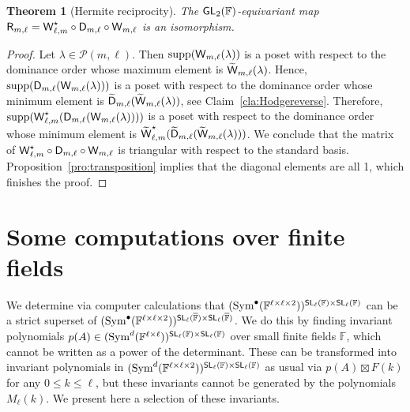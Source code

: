 \documentclass[a4paper]{extarticle}
\newcommand{\IF}{\mathbb{F}}
\newcommand{\oIF}{{\overline{\mathbb{F}}}}
\newcommand{\GL}{\textsf{\textup{GL}}}
\newcommand{\SL}{\textsf{\textup{SL}}}
\newcommand{\Sym}{\textup{Sym}}
\newcommand{\la}{\lambda}
\newcommand{\supp}{\textup{supp}}
\newcommand{\Hodge}{\textsf{\textup{D}}}
\newcommand{\Wronski}{\textsf{\textup{W}}}
\newcommand{\Hermite}{\textsf{\textup{R}}}
\newtheorem{theorem}{Theorem}
\numberwithin{theorem}{section}
\theoremstyle{definition}
\begin{document}
\begin{theorem}[Hermite reciprocity]\label{thm:hermiterec}
The $\GL_2(\IF)$-equivariant map $\Hermite_{m,\ell} =  \Wronski_{\ell,m}^\star\circ \Hodge_{m,\ell} \circ \Wronski_{m,\ell}$ is an isomorphism.
\end{theorem}

\begin{proof}
Let $\la\in\mathscr P(m,\ell)$.
Then $\supp(\Wronski_{m,\ell}(\la))$ is a poset with respect to the dominance order whose maximum element is $\widetilde{\Wronski}_{m,\ell}(\la)$.
Hence, $\supp(\Hodge_{m,\ell}(\Wronski_{m,\ell}(\la)))$ is a poset with respect to the dominance order whose minimum element is $\widetilde{\Hodge}_{m,\ell}(\widetilde{\Wronski}_{m,\ell}(\la))$, see Claim~\ref{cla:Hodgereverse}.
Therefore, $\supp(\Wronski^\star_{\ell,m}(\Hodge_{m,\ell}(\Wronski_{m,\ell}(\la))))$ is a poset with respect to the dominance order whose minimum element is $\widetilde{\Wronski}^\star_{\ell,m}(\widetilde{\Hodge}_{m,\ell}(\widetilde{\Wronski}_{m,\ell}(\la)))$.
We conclude that the matrix of $\Wronski^\star_{\ell,m}\circ\Hodge_{m,\ell}\circ\Wronski_{m,\ell}$
is triangular with respect to the standard basis.
Proposition~\ref{pro:transposition} implies that the diagonal elements are all 1, which finishes the proof.
\end{proof}








\section{Some computations over finite fields}
\label{sec:computations}
We determine via computer calculations that
$(\Sym^{\bullet}(\IF^{\ell\times\ell\times2}))^{\SL_\ell(\IF)\times \SL_\ell(\IF)}$
can be a strict superset of
$(\Sym^{\bullet}(\IF^{\ell\times\ell\times2}))^{\SL_\ell(\oIF)\times \SL_\ell(\oIF)}$.
We do this by finding invariant polynomials $p(A)\in (\Sym^d(\IF^{\ell\times\ell}))^{\SL_\ell(\IF)\times \SL_\ell(\IF)}$ over small finite fields $\IF$, which cannot be written as a power of the determinant. These can be transformed into invariant polynomials in $(\Sym^d(\IF^{\ell\times\ell\times2}))^{\SL_\ell(\IF)\times \SL_\ell(\IF)}$ as usual via $p(A)\boxtimes F(k)$ for any $0\leq k\leq \ell$, but these invariants cannot be generated by the polynomials $M_\ell(k)$.
We present here a selection of these invariants.
\end{document}
